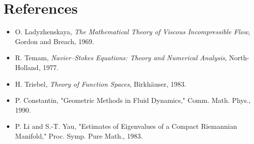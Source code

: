 \section*{References}
\begin{itemize}
    \item O. Ladyzhenskaya, \emph{The Mathematical Theory of Viscous Incompressible Flow}, Gordon and Breach, 1969.
    \item R. Temam, \emph{Navier--Stokes Equations: Theory and Numerical Analysis}, North-Holland, 1977.
    \item H. Triebel, \emph{Theory of Function Spaces}, Birkh\"auser, 1983.
    \item P. Constantin, "Geometric Methods in Fluid Dynamics," Comm. Math. Phys., 1990.
    \item P. Li and S.-T. Yau, "Estimates of Eigenvalues of a Compact Riemannian Manifold," Proc. Symp. Pure Math., 1983.
\end{itemize}


